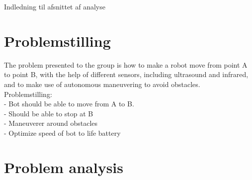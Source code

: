 Indledning til afsnittet af analyse\\

\section{Problemstilling}

The problem presented to the group is how to make a robot move from point A to point B, with the help of different sensors, including ultrasound and infrared, and to make use of autonomous maneuvering to avoid obstacles. \\


Problemstilling: \\
- Bot should be able to move from A to B.\\
- Should be able to stop at B\\
- Maneuverer around obstacles\\
- Optimize speed of bot to life battery

\section{Problem analysis}
